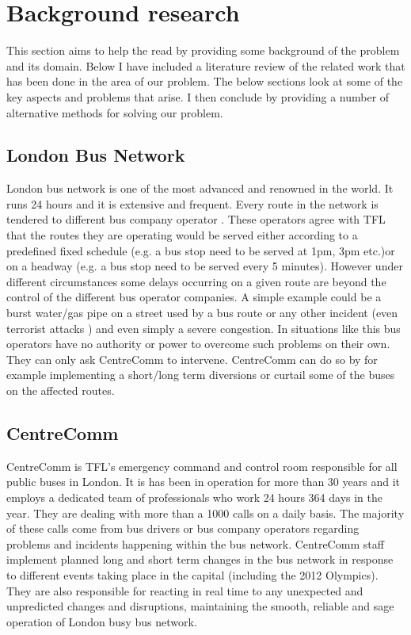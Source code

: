 \chapter{Background research}
This section aims to help the read by providing some background of the problem and its domain. Below I have included a literature review of the related work that has been done in the area of our problem. The below sections look at some of the key aspects and problems that arise. I then conclude by providing a number of alternative methods for solving our problem.

\section{London Bus Network}
London bus network is one of the most advanced and renowned in the world. It runs 24 hours and it is extensive and frequent. Every route in the network is tendered to different bus company operator \cite{busTendering}. These operators agree with TFL that the routes they are operating would be served either according to a predefined fixed schedule (e.g. a bus stop need to be served at 1pm, 3pm etc.)or on a headway (e.g. a bus stop need to be served every 5 minutes). However under different circumstances some delays occurring on a given route are beyond the control of the different bus operator companies. A simple example could be a burst water/gas pipe on a street used by a bus route or any other incident (even terrorist attacks \cite{centreComm}) and even simply a severe congestion. In situations like this bus operators have no authority or power to overcome such problems on their own. They can only ask CentreComm to intervene. CentreComm can do so by for example implementing a short/long term diversions or curtail some of the buses on the affected routes.

\section{CentreComm}
CentreComm is TFL's emergency command and control room responsible for all public buses in London. It is has been in operation for more than 30 years \cite{centreComm} and it employs a dedicated
team of professionals who work 24 hours 364 days in the year. They are dealing with more than a 1000 calls on a daily basis. The majority of these calls come from bus drivers or bus company operators regarding problems and incidents happening within the bus network. CentreComm staff implement planned long and short term changes in the bus network in response to different events taking place in the capital (including the 2012 Olympics). They are also responsible for reacting in real time to any unexpected and unpredicted changes and disruptions, maintaining the smooth, reliable and sage operation of London busy bus network.


